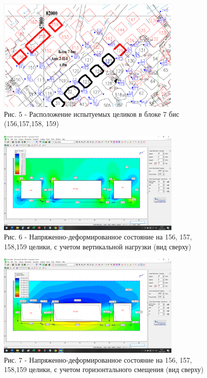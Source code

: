 \begin{figure}[H]
	\centering
	\includegraphics[width=0.8\textwidth]{media/gor/image9}
	\caption*{ Рис. 5 - Расположение испытуемых целиков в блоке 7 бис
	(156,157,158, 159)}
\end{figure}



\begin{figure}[H]
	\centering
	\includegraphics[width=0.8\textwidth]{media/gor/image10}
	\caption*{ Рис. 6 - Напряженно-деформированное состояние на 156, 157,
	158,159 целики, с учетом вертикальной нагрузки (вид сверху)}
\end{figure}


\begin{figure}[H]
	\centering
	\includegraphics[width=0.8\textwidth]{media/gor/image11}
	\caption*{Рис. 7 - Напряженно-деформированное состояние на 156, 157,
	158,159 целики, с учетом горизонтального смещения (вид сверху)}
\end{figure}




